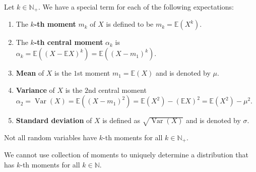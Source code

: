 \documentclass{huhtakm-template-book}
\newcommand{\expect}{\mathbb{E}}
\DeclareMathOperator{\Var}{Var}
\begin{document}
    \begin{defn}
        Let $k\in\mathbb{N}_{+}$. We have a special term for each of the following expectations:
        \begin{enumerate}
        	\item The \textbf{$k$-th moment} $m_{k}$ of $X$ is defined to be $m_{k}=\expect(X^{k})$.
        	\item The \textbf{$k$-th central moment} $\alpha_{k}$ is $\alpha_{k}=\expect((X-\expect X)^{k})=\expect((X-m_{1})^{k})$.
        	\item \textbf{Mean} of $X$ is the $1$st moment $m_{1}=\expect(X)$ and is denoted by $\mu$.
        	\item \textbf{Variance} of $X$ is the $2$nd central moment $\alpha_{2}=\Var(X)=\expect((X-m_{1})^{2})=\expect(X^{2})-(\expect X)^{2}=\expect(X^{2})-\mu^{2}$.
        	\item \textbf{Standard deviation} of $X$ is defined as $\sqrt{\Var(X)}$ and is denoted by $\sigma$.
        \end{enumerate}
    \end{defn}
    \begin{rem}
        Not all random variables have $k$-th moments for all $k\in\mathbb{N}_{+}$.
    \end{rem}
    \begin{rem}
        We cannot use collection of moments to uniquely determine a distribution that has $k$-th moments for all $k\in\mathbb{N}$.
    \end{rem}
    \newpage
    
\end{document}
